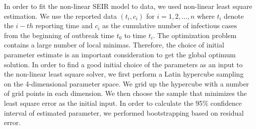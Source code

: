 \documentclass[10pt, journal,onecolumn]{IEEEtran}
\begin{document}
In order to fit the non-linear SEIR model to data, we used non-linear least square estimation. We use the reported data $(t_i, c_i)$ for $i=1,2,\ldots,n$ where $t_i$ denote the $i-th$ reporting time and $c_i$ as the cumulative number of infectious cases from the beginning of outbreak time $t_0$ to time $t_i$. The optimization problem contains a large number of local minimas. Therefore, the choice of initial parameter estimate is an important consideration to get the global optimum solution. In order to find a good initial choice of the parameters as an input to the non-linear least square solver, we first perform a Latin hypercube sampling on the  4-dimensional parameter space.  We grid up the hypercube with a number of grid points in each dimension.  We then choose the sample that minimizes the least square error as the initial input. In order to calculate the 95\% confidence interval of estimated parameter, we performed bootstrapping based on residual error.
\end{document}
